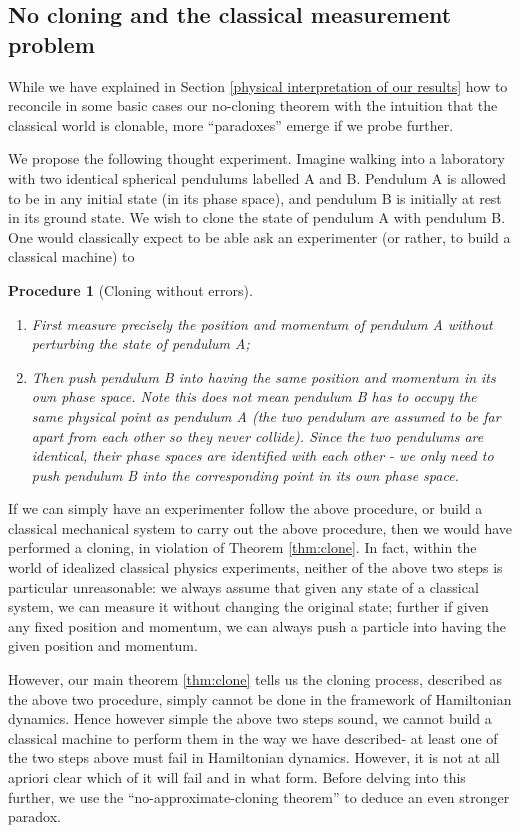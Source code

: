 \documentclass[jmp,amsmath,amssymb]{revtex4-1}
\theoremstyle{plain}
\newtheorem{procedure}[theorem]{Procedure}
\begin{document}
\subsection{No cloning and the classical measurement problem}


While we have explained in Section \ref{physical interpretation of our results} how to reconcile in some basic cases our no-cloning theorem with the intuition that the classical world is clonable, more ``paradoxes'' emerge if we probe further.

We propose the following thought experiment. Imagine walking into a laboratory with two identical spherical pendulums labelled A and B. Pendulum A is allowed to be in any initial state (in its phase space), and pendulum B is initially at rest in its ground state. We wish to clone the state of pendulum A with pendulum B. One would classically expect to be able ask an experimenter (or rather, to build a classical machine) to
\begin{procedure}[Cloning without errors]

\begin{enumerate}
    \item \textup{First measure precisely the position and momentum of pendulum A without perturbing the state of pendulum A;}
    \item \textup{Then push pendulum B into having the same position and momentum in its own phase space. Note this does not mean pendulum B has to occupy the same physical point as pendulum A (the two pendulum are assumed to be far apart from each other so they never collide). Since the two pendulums are identical, their phase spaces are identified with each other - we only need to push pendulum B into the corresponding point in its own phase space.}
\end{enumerate}
\end{procedure}
If we can simply have an experimenter follow the above procedure, or build a classical mechanical system to carry out the above procedure, then we would have performed a cloning, in violation of Theorem \ref{thm:clone}. In fact, within the world of idealized classical physics experiments, neither of the above two steps is particular unreasonable: we always assume that given any state of a classical system, we can measure it without changing the original state; further if given any fixed position and momentum, we can always push a particle into having the given position and momentum.

However, our main theorem \ref{thm:clone} tells us the cloning process, described as the above two procedure, simply cannot be done in the framework of Hamiltonian dynamics. Hence however simple the above two steps sound, we cannot build a classical machine to perform them in the way we have described-  at least one of the two steps above must fail in Hamiltonian dynamics. However, it is not at all apriori clear which of it will fail and in what form. Before delving into this further, we use the ``no-approximate-cloning theorem'' to deduce an even stronger paradox.
\end{document}
